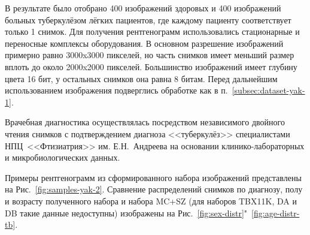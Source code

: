 В результате было отобрано 400 изображений здоровых и 400 изображений больных туберкулёзом лёгких пациентов, где каждому пациенту соответствует только 1 снимок. Для получения рентгенограмм использовались стационарные и переносные комплексы оборудования. В основном разрешение изображений примерно равно 3000x3000 пикселей, но часть снимков имеет меньший размер вплоть до около 2000x2000 пикселей. Большинство изображений имеет глубину цвета 16 бит, у остальных снимков она равна 8 битам. Перед дальнейшим использованием изображения подверглись обработке как в п.~\ref{subsec:dataset-yak-1}.

Врачебная диагностика осуществлялась посредством независимого двойного чтения снимков с подтверждением диагноза <<туберкулёз>> специалистами НПЦ~<<Фтизиатрия>> им. Е.Н.~Андреева на основании клинико-лабораторных и микробиологических данных.

Примеры рентгенограмм из сформированного набора изображений представлены на Рис.~\ref{fig:samples-yak-2}. Сравнение распределений снимков по диагнозу, полу и возрасту полученного набора и набора MC+SZ (для наборов TBX11K, DA и DB такие данные недоступны) изображены на Рис.~\ref{fig:sex-distr}"~\ref{fig:age-distr-tb}.



\clearpage